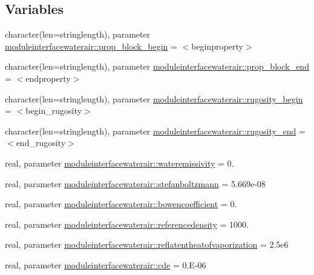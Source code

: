 \subsection*{Variables}
\begin{DoxyCompactItemize}
\item 
character(len=stringlength), parameter \mbox{\hyperlink{namespacemoduleinterfacewaterair_a5b4bd7da5a9e3e4da1bfe7edd8b805ac}{moduleinterfacewaterair\+::prop\+\_\+block\+\_\+begin}} = \textquotesingle{}$<$beginproperty$>$\textquotesingle{}
\item 
character(len=stringlength), parameter \mbox{\hyperlink{namespacemoduleinterfacewaterair_abb372346805a352ba54048bced113782}{moduleinterfacewaterair\+::prop\+\_\+block\+\_\+end}} = \textquotesingle{}$<$endproperty$>$\textquotesingle{}
\item 
character(len=stringlength), parameter \mbox{\hyperlink{namespacemoduleinterfacewaterair_a0278d4530d0ebedf0d59117a3c772f93}{moduleinterfacewaterair\+::rugosity\+\_\+begin}} = \textquotesingle{}$<$begin\+\_\+rugosity$>$\textquotesingle{}
\item 
character(len=stringlength), parameter \mbox{\hyperlink{namespacemoduleinterfacewaterair_a58a4130456c2f79f5500a5ccb4517cfd}{moduleinterfacewaterair\+::rugosity\+\_\+end}} = \textquotesingle{}$<$end\+\_\+rugosity$>$\textquotesingle{}
\item 
real, parameter \mbox{\hyperlink{namespacemoduleinterfacewaterair_af9d25ee72bf87831a84be25bc8435c55}{moduleinterfacewaterair\+::wateremissivity}} = 0.
\item 
real, parameter \mbox{\hyperlink{namespacemoduleinterfacewaterair_a4c926bc0f796609398890a390dc9d36c}{moduleinterfacewaterair\+::stefanboltzmann}} = 5.\+669e-\/08
\item 
real, parameter \mbox{\hyperlink{namespacemoduleinterfacewaterair_a8155eb359d8312366017041e27b20e8b}{moduleinterfacewaterair\+::bowencoefficient}} = 0.
\item 
real, parameter \mbox{\hyperlink{namespacemoduleinterfacewaterair_a65185c3b0a782bd2b12e894ee2619550}{moduleinterfacewaterair\+::referencedensity}} = 1000.
\item 
real, parameter \mbox{\hyperlink{namespacemoduleinterfacewaterair_a56a7408ea5d0be55c3bed3cda2294990}{moduleinterfacewaterair\+::reflatentheatofvaporization}} = 2.\+5e6
\item 
real, parameter \mbox{\hyperlink{namespacemoduleinterfacewaterair_ac4e6928da233e97fced767b3ff6b8482}{moduleinterfacewaterair\+::cde}} = 0.\+E-\/06

\end{DoxyCompactItemize}

